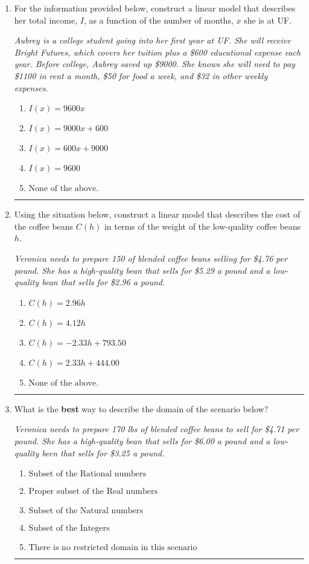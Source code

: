 \documentclass[14pt]{extbook}
\newcommand{\litem}[1]{\item#1\hspace*{-1cm}\rule{\textwidth}{0.4pt}}
\begin{document}
\begin{enumerate}
{\begin{enumerate}[label=\Alph*.]
\end{enumerate} }
\litem{
For the information provided below, construct a linear model that describes her total income, $I$, as a function of the number of months, $x$ she is at UF.
\begin{center}
    \textit{ Aubrey is a college student going into her first year at UF. She will receive Bright Futures, which covers her tuition plus a \$600 educational expense each year. Before college, Aubrey saved up \$9000. She knows she will need to pay \$1100 in rent a month, \$50 for food a week, and \$32 in other weekly expenses. }
\end{center}
\begin{enumerate}[label=\Alph*.]
\item \( I(x) = 9600 x \)
\item \( I(x) = 9000 x + 600 \)
\item \( I(x) = 600 x + 9000 \)
\item \( I(x) = 9600 \)
\item \( \text{None of the above.} \)

\end{enumerate} }
\litem{
Using the situation below, construct a linear model that describes the cost of the coffee beans $C(h)$ in terms of the weight of the low-quality coffee beans $h$.
\begin{center}
    \textit{ Veronica needs to prepare 150 of blended coffee beans selling for \$4.76 per pound. She has a high-quality bean that sells for \$5.29 a pound and a low-quality bean that sells for \$2.96 a pound. }
\end{center}
\begin{enumerate}[label=\Alph*.]
\item \( C(h) = 2.96 h \)
\item \( C(h) = 4.12 h \)
\item \( C(h) = -2.33 h + 793.50 \)
\item \( C(h) = 2.33 h + 444.00 \)
\item \( \text{None of the above.} \)

\end{enumerate} }
\litem{
What is the \textbf{best} way to describe the domain of the scenario below?
\begin{center}
    \textit{ Veronica needs to prepare 170 lbs of blended coffee beans to sell for \$4.71 per pound. She has a high-quality bean that sells for \$6.00 a pound and a low-quality been that sells for \$3.25 a pound. }
\end{center}
\begin{enumerate}[label=\Alph*.]
\item \( \text{Subset of the Rational numbers} \)
\item \( \text{Proper subset of the Real numbers} \)
\item \( \text{Subset of the Natural numbers} \)
\item \( \text{Subset of the Integers} \)
\item \( \text{There is no restricted domain in this scenario} \)


\end{enumerate}}
\end{enumerate}
\end{document}
